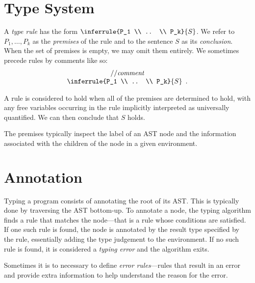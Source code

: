 \documentclass{book}
\newcommand\RuleComment[1]{// \textit{#1}}
\begin{document}
\section{Type System}
A \emph{type rule} has the form $\inferrule{P_1 \\ .. \\ P_k}{S}$. We refer to $P_1,\ldots,P_k$ as the \emph{premises} of the rule and to the sentence $S$ as its \emph{conclusion}. When the set of premises is empty, we may omit them entirely.
%
We sometimes precede rules by comments like so:
\[
\begin{array}{c}
\RuleComment{comment}\\
\inferrule{P_1 \\ .. \\ P_k}{S} \enspace.
\end{array} 
\]

A rule is considered to hold when all of the premises are determined to hold, with any  free variables occurring in the rule implicitly interpreted as universally quantified. We can then conclude that $S$ holds.

The premises typically inspect the label of an AST node and the information associated with the children of the node in a given environment.

\section{Annotation}

Typing a program consists of annotating the root of its AST. This is typically
done by traversing the AST bottom-up.  To annotate a node, the typing algorithm
finds a rule that matches the node---that is a rule whose conditions are
satisfied. If one such rule is found, the node is annotated by the  result type
specified by the rule, essentially adding the type judgement to the
environment.  If no such rule is found, it is considered a \emph{typing error}
and the algorithm exits.

Sometimes it is to necessary to define \emph{error rules}---rules that result
in an error and provide extra information to help understand the reason for the
error.
\end{document}
